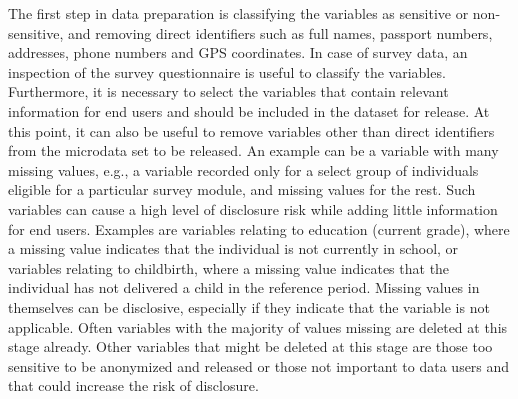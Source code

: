 \documentclass[letterpaper,10pt,english]{sphinxmanual}
\begin{document}
The first step in data preparation is classifying the variables as
sensitive or non-sensitive, and removing direct identifiers such as full
names, passport numbers, addresses, phone numbers and GPS coordinates.
In case of survey data, an inspection of the survey questionnaire is
useful to classify the variables. Furthermore, it is necessary to select
the variables that contain relevant information for end users and should
be included in the dataset for release. At this point, it can also be
useful to remove variables other than direct identifiers from the
microdata set to be released. An example can be a variable with many
missing values, e.g., a variable recorded only for a select group of
individuals eligible for a particular survey module, and missing values
for the rest. Such variables can cause a high level of disclosure risk
while adding little information for end users. Examples are variables
relating to education (current grade), where a missing value indicates
that the individual is not currently in school, or variables relating to
childbirth, where a missing value indicates that the individual has not
delivered a child in the reference period. Missing values in themselves
can be disclosive, especially if they indicate that the variable is not
applicable. Often variables with the majority of values missing are
deleted at this stage already. Other variables that might be deleted at
this stage are those too sensitive to be anonymized and released or
those not important to data users and that could increase the risk of
disclosure.
\end{document}
